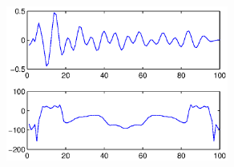 \documentclass[a4paper,11pt]{article}
\begin{document}
\begin{alltt}
  	\begin{figure}[H]
	  		\begin{center}
				\includegraphics[width=0.65\textwidth]{Sessie2/IRbs3.eps}
			\end{center}
			\label{benadering}
  	\end{figure}


\end{alltt}
\end{document}
